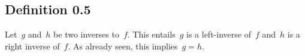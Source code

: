 \subsection*{Definition 0.5}

Let~$g$ and~$h$ be two inverses to~$f$.
This entails~$g$ is a left-inverse of~$f$ and~$h$ is a right inverse of~$f$.
As already seen, this implies~$g = h$.
